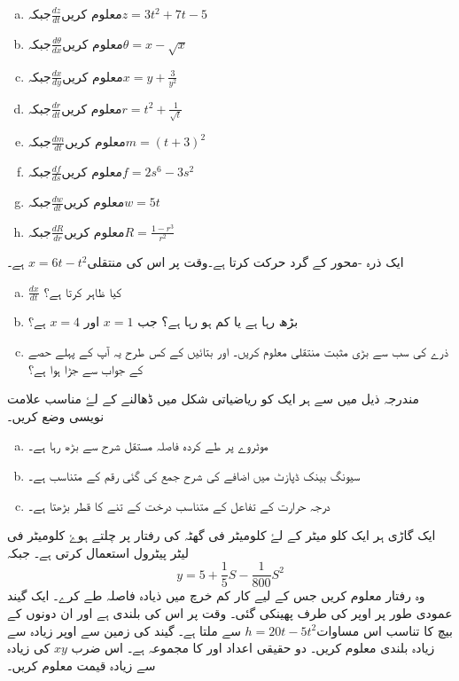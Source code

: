 \begin{enumerate}[a.]
\item
معلوم کریں\( \frac{dz}{dt} \)جبکہ\( z=3t^2+7t-5 \)
\item
معلوم کریں\( \frac{d\theta}{dx} \)جبکہ\( \theta =x-\sqrt{x} \)
\item
معلوم کریں\(  \frac{dx}{dy} \)جبکہ\(  x=y+\frac{3}{y^2}\)
\item
معلوم کریں\( \frac{dr}{dt} \)جبکہ\(  r=t^2+\frac{1}{\sqrt{t}}\)
\item
معلوم کریں\( \frac{dm}{dt} \)جبکہ\( m=(t+3)^2 \)
\item
معلوم کریں\( \frac{df}{ds} \)جبکہ\( f=2s^6-3s^2 \)
\item
معلوم کریں\( \frac{dw}{dt} \)جبکہ\( w=5t \)
\item
معلوم کریں\(  \frac{dR}{dr}\)جبکہ\( R=\frac{1-r^3}{r^2} \)
\end{enumerate}

ایک ذرہ -محور کے گرد حرکت کرتا ہے۔وقت  پر اس کی منتقلی\( x=6t-t^{2} \) ہے۔
\begin{enumerate}[a.]
\item
\( \frac{dx}{dt} \)
کیا ظاہر کرتا ہے؟
\item
   بڑھ رہا ہے یا کم ہو رہا ہے؟ جب \(x=1\) اور \(x=4\) ہے؟

\item
ذرے کی سب سے بڑی مثبت منتقلی معلوم کریں۔ اور بتائیں کے کس طرح یہ آپ کے پہلے حصے کے جواب سے جڑا ہوا ہے؟
\end{enumerate}

مندرجہ ذیل میں سے ہر ایک کو ریاضیاتی شکل میں ڈھالنے  کے لۓ مناسب علامت نویسی وضع کریں۔
\begin{enumerate}[a.]
\item
موٹروے پر طے کردہ فاصلہ مستقل شرح سے بڑھ رہا ہے۔
\item
سیونگ بینک ڈپازٹ میں اضافے کی شرح جمع کی گئی رقم کے متناسب ہے۔
\item
 درجہ حرارت کے تفاعل کے متناسب درخت کے تنے کا قطر بڑھتا ہے۔ 
\end{enumerate}
ایک گاڑی ہر ایک کلو میٹر کے لۓ  کلومیٹر فی گھٹہ کی رفتار پر چلتے ہوۓ  کلومیٹر فی لیٹر پیٹرول استعمال کرتی ہے۔  جبکہ \[ y=5+\frac{1}{5}S-\frac{1}{800}S^2 \]
وہ رفتار معلوم کریں جس کے لیے کار کم خرچ میں ذیادہ فاصلہ طے کرے۔
ایک گیند عمودی طور پر اوپر کی طرف پھینکی گئی۔ وقت  پر اس کی بلندی  ہے اور ان دونوں کے بیچ کا تناسب اس مساوات\(h=20t-5t^2 \) سے ملتا ہے۔ گیند کی زمین سے اوپر زیادہ سے زیادہ بلندی معلوم کریں۔
دو حقیقی اعداد  اور  کا مجموعہ  ہے۔ اس ضرب \( xy \) کی زیادہ سے زیادہ قیمت معلوم کریں۔


